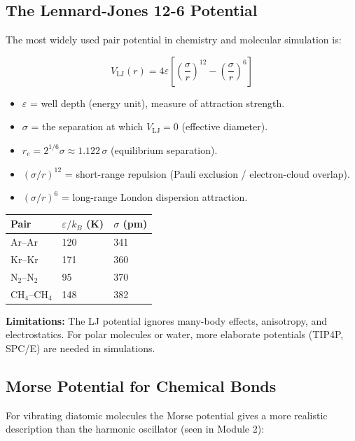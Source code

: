 \documentclass[12pt,a4paper]{article}
\begin{document}
\subsection{The Lennard-Jones 12-6 Potential}
The most widely used pair potential in chemistry and molecular simulation is:

\begin{tcolorbox}[formulabox, title={Lennard-Jones (12-6) Potential}]
\[
V_{\mathrm{LJ}}(r) = 4\varepsilon\!\left[\left(\frac{\sigma}{r}\right)^{12}-\left(\frac{\sigma}{r}\right)^{6}\right]
\]
\begin{itemize}[leftmargin=*, itemsep=1pt, topsep=2pt]
  \item $\varepsilon$ = well depth (energy unit), measure of attraction strength.
  \item $\sigma$ = the separation at which $V_{\mathrm{LJ}}=0$ (effective diameter).
  \item $r_e = 2^{1/6}\sigma \approx 1.122\,\sigma$ (equilibrium separation).
  \item $(\sigma/r)^{12}$ = short-range repulsion (Pauli exclusion / electron-cloud overlap).
  \item $(\sigma/r)^{6}$ = long-range London dispersion attraction.
\end{itemize}
\end{tcolorbox}

\begin{tabularx}{\linewidth}{|B{2.4cm}|Y|Y|}
\hline
\textbf{Pair} & \textbf{$\varepsilon/k_B$ (K)} & \textbf{$\sigma$ (pm)} \\
\hline
Ar--Ar & 120 & 341 \\
\hline
Kr--Kr & 171 & 360 \\
\hline
$\mathrm{N_2}$--$\mathrm{N_2}$ & 95 & 370 \\
\hline
$\mathrm{CH_4}$--$\mathrm{CH_4}$ & 148 & 382 \\
\hline
\end{tabularx}

\textbf{Limitations:} The LJ potential ignores many-body effects, anisotropy, and electrostatics. For polar molecules or water, more elaborate potentials (TIP4P, SPC/E) are needed in simulations.

\subsection{Morse Potential for Chemical Bonds}
For vibrating diatomic molecules the Morse potential gives a more realistic description than the harmonic oscillator (seen in Module 2):
\end{document}

